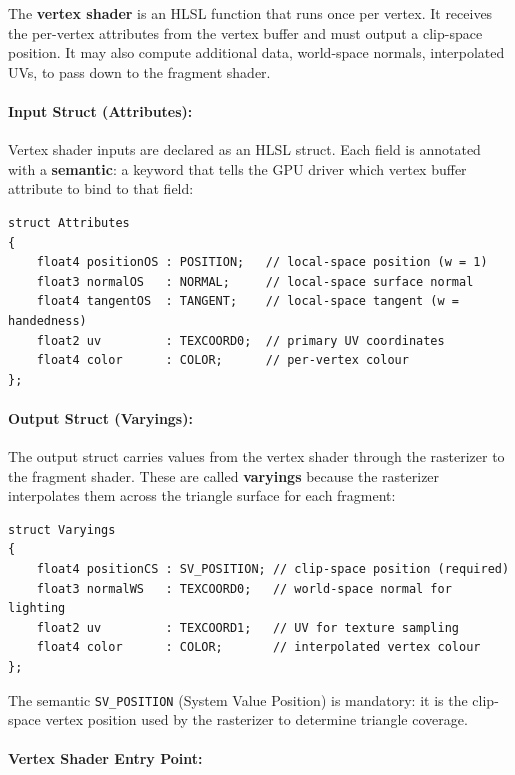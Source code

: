 \documentclass[11pt]{article}
\begin{document}
The \textbf{vertex shader} is an HLSL function that runs once per vertex. It receives the per-vertex attributes from the vertex buffer and must output a clip-space position. It may also compute additional data, world-space normals, interpolated UVs, to pass down to the fragment shader.

\paragraph{Input Struct (Attributes):}

Vertex shader inputs are declared as an HLSL struct. Each field is annotated with a \textbf{semantic}: a keyword that tells the GPU driver which vertex buffer attribute to bind to that field:

\begin{lstlisting}
struct Attributes
{
    float4 positionOS : POSITION;   // local-space position (w = 1)
    float3 normalOS   : NORMAL;     // local-space surface normal
    float4 tangentOS  : TANGENT;    // local-space tangent (w = handedness)
    float2 uv         : TEXCOORD0;  // primary UV coordinates
    float4 color      : COLOR;      // per-vertex colour
};
\end{lstlisting}

\paragraph{Output Struct (Varyings):}

The output struct carries values from the vertex shader through the rasterizer to the fragment shader. These are called \textbf{varyings} because the rasterizer interpolates them across the triangle surface for each fragment:

\begin{lstlisting}
struct Varyings
{
    float4 positionCS : SV_POSITION; // clip-space position (required)
    float3 normalWS   : TEXCOORD0;   // world-space normal for lighting
    float2 uv         : TEXCOORD1;   // UV for texture sampling
    float4 color      : COLOR;       // interpolated vertex colour
};
\end{lstlisting}

The semantic \texttt{SV\_POSITION} (System Value Position) is mandatory: it is the clip-space vertex position used by the rasterizer to determine triangle coverage.

\paragraph{Vertex Shader Entry Point:}
\end{document}
